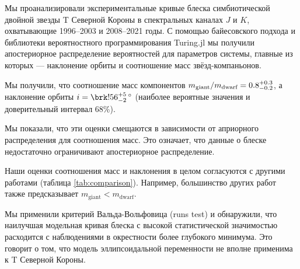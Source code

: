 Мы проанализировали экспериментальные кривые блеска симбиотической двойной звезды T Северной Короны в спектральных каналах $J$ и $K$, охватывающие 1996--2003 и 2008--2021 годы. С помощью байесовского подхода и библиотеки вероятностного программирования Turing.jl мы получили апостериорное распределение вероятностей для параметров системы, главные из которых ---  наклонение орбиты и соотношение масс звёзд-компаньонов.

Мы получили, что соотношение масс компонентов $m_\text{giant} / m_\text{dwarf} = 0.8^{+0.3}_{-0.2}$, а наклонение орбиты $i = \resulti$ (наиболее вероятные значения и доверительный интервал 68\%).

Мы показали, что эти оценки смещаются в зависимости от априорного распределения для соотношения масс. Это означает, что данные о блеске недостаточно ограничивают апостериорное распределение.

Наши оценки соотношения масс и наклонения в целом согласуются с другими работами (таблица \ref{tab:comparison}). Например, большинство других работ также предсказывает $m_\text{giant} < m_\text{dwarf}$.

Мы применили критерий Вальда-Вольфовица (runs test) и обнаружили, что наилучшая модельная кривая блеска с высокой статистической значимостью расходится с наблюдениями в окрестности более глубокого минимума. Это говорит о том, что модель эллипсоидальной переменности не вполне применима к T Северной Короны.


\showbib


